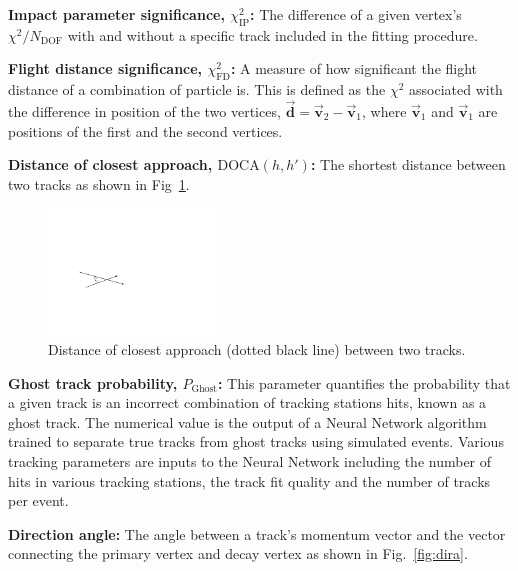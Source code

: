 \begin{description}
\item \textbf{Impact parameter significance, $\chi^{2}_{\text{IP}}$:} The difference of a given vertex's $\chi^{2}/N_{\text{DOF}}$ with and without a specific track included in the fitting procedure.
\item \textbf{Flight distance significance, $\chi^{2}_{\text{FD}}$:} A measure of how significant the flight distance of a combination of particle is. This is defined as the $\chi^{2}$ associated with the difference in position of the two vertices, $\vec{\mathbf{d}} = \vec{\mathbf{v}}_2 - \vec{\mathbf{v}}_1$, where $\vec{\mathbf{v}}_1$ and $\vec{\mathbf{v}}_1$ are positions of the first and the second vertices. 
\item \textbf{Distance of closest approach, $\text{DOCA}(h,h')$:} The shortest distance between two tracks as shown in Fig~\ref{fig:doca}.
\begin{figure}[!h]
    \centering
    \includegraphics[width=0.4\textwidth]{figs/Selection/DOCA.pdf}
    \caption{Distance of closest approach (dotted black line) between two tracks.}
    \label{fig:doca}   
\end{figure}


\item \textbf{Ghost track probability, $P_{\text{Ghost}}$:} This parameter quantifies the probability that a given track is an incorrect combination of tracking stations hits, known as a ghost track. The numerical value is the output of a Neural Network algorithm trained to separate true tracks from ghost tracks using simulated events. Various tracking parameters are inputs to the Neural Network including the number of hits in various tracking stations, the track fit quality and the number of tracks per event. 

\item \textbf{Direction angle:} The angle between a track's momentum vector and the vector connecting the primary vertex and decay vertex as shown in Fig.~\ref{fig:dira}.


\end{description}
